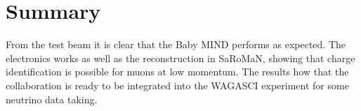 


\pagebreak
\section{Summary}
From the test beam it is clear that the Baby MIND performs as expected. The electronics works as well as the reconstruction in SaRoMaN, showing that charge identification is possible for muons at low momentum. The results how that the collaboration is ready to be integrated into the WAGASCI experiment for some neutrino data taking. 
